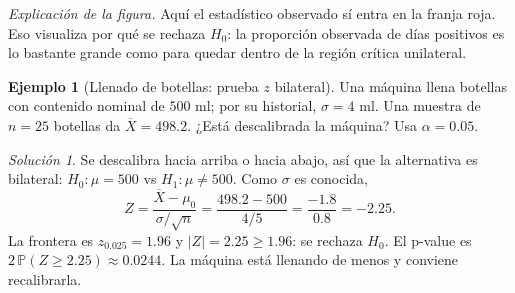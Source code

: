 \documentclass[11pt]{article}
\theoremstyle{plain}
\theoremstyle{definition}
\newtheorem{example}[theorem]{Ejemplo}
\theoremstyle{remark}
\theoremstyle{solstyle}
\newtheorem*{solution}{Solución}
\newcommand{\Pbb}{\mathbb{P}}
\newcommand{\1}{\mathbbm{1}}
\newcommand{\Xbar}{\overline{X}}
\begin{document}
\begin{center}
\end{center}

\noindent\textit{Explicación de la figura.} Aquí el estadístico observado sí entra en la franja roja. Eso visualiza por qué se rechaza $H_0$: la proporción observada de días positivos es lo bastante grande como para quedar dentro de la región crítica unilateral.

\begin{example}[Llenado de botellas: prueba $z$ bilateral]\label{ex:botellas}
Una máquina llena botellas con contenido nominal de $500$ ml; por su historial, $\sigma=4$ ml. Una muestra de $n=25$ botellas da $\Xbar=498.2$. ¿Está descalibrada la máquina? Usa $\alpha=0.05$.
\end{example}

\begin{solution}
Se descalibra hacia arriba o hacia abajo, así que la alternativa es bilateral: $H_0:\mu=500$ vs $H_1:\mu\neq500$. Como $\sigma$ es conocida,
\[
Z=\frac{\Xbar-\mu_0}{\sigma/\sqrt n}=\frac{498.2-500}{4/5}=\frac{-1.8}{0.8}=-2.25 .
\]
La frontera es $z_{0.025}=1.96$ y $|Z|=2.25\ge1.96$: se rechaza $H_0$. El p-value es $2\,\Pbb(Z\ge2.25)\approx 0.0244$. La máquina está llenando de menos y conviene recalibrarla.
\end{solution}
\end{document}
